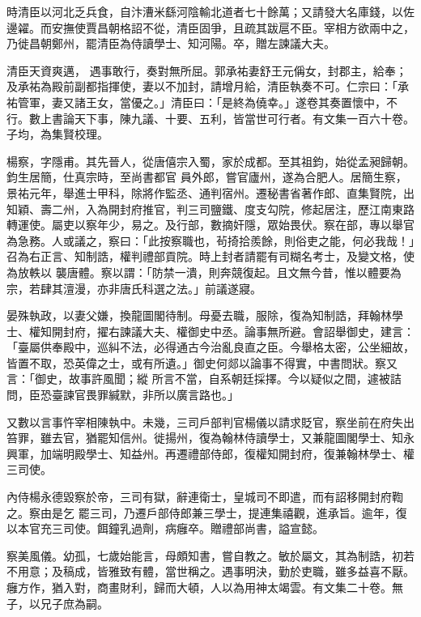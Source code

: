 \begin{pinyinscope}
 時清臣以河北乏兵食，自汴漕米繇河陰輸北道者七十餘萬；又請發大名庫錢，以佐邊糴。而安撫使賈昌朝格詔不從，清臣固爭，且疏其跋扈不臣。宰相方欲兩中之，乃徙昌朝鄭州，罷清臣為侍讀學士、知河陽。卒，贈左諫議大夫。



 清臣天資爽邁，
 遇事敢行，奏對無所屈。郭承祐妻舒王元偁女，封郡主，給奉；及承祐為殿前副都指揮使，妻以不加封，請增月給，清臣執奏不可。仁宗曰：「承祐管軍，妻又諸王女，當優之。」清臣曰：「是終為僥幸。」遂卷其奏置懷中，不行。數上書論天下事，陳九議、十要、五利，皆當世可行者。有文集一百六十卷。子均，為集賢校理。



 楊察，字隱甫。其先晉人，從唐僖宗入蜀，家於成都。至其祖鈞，始從孟昶歸朝。鈞生居簡，仕真宗時，至尚書都官
 員外郎，嘗官廬州，遂為合肥人。居簡生察，景祐元年，舉進士甲科，除將作監丞、通判宿州。遷秘書省著作郎、直集賢院，出知穎、壽二州，入為開封府推官，判三司鹽鐵、度支勾院，修起居注，歷江南東路轉運使。屬吏以察年少，易之。及行部，數摘奸隱，眾始畏伏。察在部，專以舉官為急務。人或議之，察曰：「此按察職也，茍掎拾羨餘，則俗吏之能，何必我哉！」召為右正言、知制誥，權判禮部貢院。時上封者請罷有司糊名考士，及變文格，使為放軼以
 襲唐體。察以謂：「防禁一潰，則奔競復起。且文無今昔，惟以體要為宗，若肆其澶漫，亦非唐氏科選之法。」前議遂寢。



 晏殊執政，以妻父嫌，換龍圖閣待制。母憂去職，服除，復為知制誥，拜翰林學士、權知開封府，擢右諫議大夫、權御史中丞。論事無所避。會詔舉御史，建言：「臺屬供奉殿中，巡糾不法，必得通古今治亂良直之臣。今舉格太密，公坐細故，皆置不取，恐英偉之士，或有所遺。」御史何郯以論事不得實，中書問狀。察又言：「御史，故事許風聞；縱
 所言不當，自系朝廷採擇。今以疑似之間，遽被詰問，臣恐臺諫官畏罪緘默，非所以廣言路也。」



 又數以言事忤宰相陳執中。未幾，三司戶部判官楊儀以請求貶官，察坐前在府失出笞罪，雖去官，猶罷知信州。徙揚州，復為翰林侍讀學士，又兼龍圖閣學士、知永興軍，加端明殿學士、知益州。再遷禮部侍郎，復權知開封府，復兼翰林學士、權三司使。



 內侍楊永德毀察於帝，三司有獄，辭連衛士，皇城司不即遣，而有詔移開封府鞫之。察由是乞
 罷三司，乃遷戶部侍郎兼三學士，提連集禧觀，進承旨。逾年，復以本官充三司使。餌鐘乳過劑，病癰卒。贈禮部尚書，謚宣懿。



 察美風儀。幼孤，七歲始能言，母頗知書，嘗自教之。敏於屬文，其為制誥，初若不用意；及稿成，皆雅致有體，當世稱之。遇事明決，勤於吏職，雖多益喜不厭。癰方作，猶入對，商畫財利，歸而大頓，人以為用神太竭雲。有文集二十卷。無子，以兄子庶為嗣。




\end{pinyinscope}
